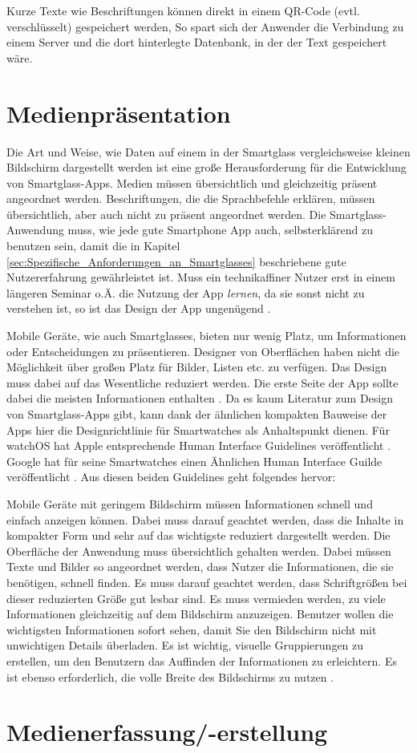 Kurze Texte wie Beschriftungen können direkt in einem QR-Code (evtl. verschlüsselt) gespeichert werden, So spart sich der Anwender die Verbindung zu einem Server und die dort hinterlegte Datenbank, in der der Text gespeichert wäre.
%
%
\section{Medienpräsentation}
\label{sec:Medienpraesentation}
Die Art und Weise, wie Daten auf einem in der Smartglass vergleichsweise kleinen Bildschirm dargestellt werden ist eine große Herausforderung für die Entwicklung von Smartglass-Apps. Medien müssen übersichtlich und gleichzeitig präsent angeordnet werden. Beschriftungen, die die Sprachbefehle erklären, müssen übersichtlich, aber auch nicht zu präsent angeordnet werden. Die Smartglass- Anwendung muss, wie jede gute Smartphone App auch, selbsterklärend zu benutzen sein, damit die in Kapitel \ref{sec:Spezifische_Anforderungen_an_Smartglasses} beschriebene gute Nutzererfahrung gewährleistet ist. 
Muss ein technikaffiner Nutzer erst in einem längeren Seminar o.Ä. die Nutzung der App \emph{lernen}, da sie sonst nicht zu verstehen ist, so ist das Design der App ungenügend \cite{Hoober2011} \cite[S.~141ff]{Norman2013}.

Mobile Geräte, wie auch Smartglasses, bieten nur wenig Platz, um Informationen oder Entscheidungen zu präsentieren. Designer von Oberflächen haben nicht die Möglichkeit über großen Platz für Bilder, Listen etc. zu verfügen. Das Design muss dabei auf das Wesentliche reduziert werden. Die erste Seite der App sollte dabei die meisten Informationen enthalten \cite[S.~442]{Tidwell2005}. Da es kaum Literatur zum Design von Smartglass-Apps gibt, kann dank der ähnlichen kompakten Bauweise der Apps hier die Designrichtlinie für Smartwatches als Anhaltspunkt dienen. Für watchOS hat Apple entsprechende Human Interface Guidelines veröffentlicht  \cite{Apple2018c}. Google hat für seine Smartwatches einen Ähnlichen Human Interface Guilde veröffentlicht \cite{Google2018}. Aus diesen beiden Guidelines geht folgendes hervor:

Mobile Geräte mit geringem Bildschirm müssen Informationen schnell und einfach anzeigen können. Dabei muss darauf geachtet werden, dass die Inhalte in kompakter Form und sehr auf das wichtigste reduziert dargestellt werden. Die Oberfläche der Anwendung muss übersichtlich gehalten werden. Dabei müssen Texte und Bilder so angeordnet werden, dass Nutzer die Informationen, die sie benötigen, schnell finden. Es muss darauf geachtet werden, dass Schriftgrößen bei dieser reduzierten Größe gut lesbar sind. Es muss vermieden werden, zu viele Informationen gleichzeitig auf dem Bildschirm anzuzeigen. Benutzer wollen die wichtigsten Informationen sofort sehen, damit Sie den Bildschirm nicht mit unwichtigen Details überladen. 
Es ist wichtig, visuelle Gruppierungen zu erstellen, um den Benutzern das Auffinden der Informationen zu erleichtern. Es ist ebenso erforderlich, die volle Breite des Bildschirms zu nutzen \cite{Apple2018c, Google2018}.
%
%
\section{Medienerfassung/-erstellung}
\label{sec:Medienerfassung_-erstellung}
